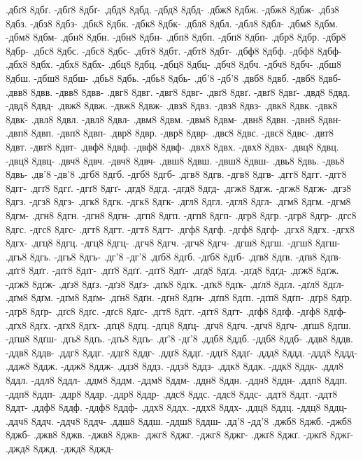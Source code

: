 {.дбґ8 8дбґ. -дбґ8 8дбґ-
.дбд8 8дбд. -дбд8 8дбд-
.дбж8 8дбж. -дбж8 8дбж-
.дбз8 8дбз. -дбз8 8дбз-
.дбк8 8дбк. -дбк8 8дбк-
.дбл8 8дбл. -дбл8 8дбл-
.дбм8 8дбм. -дбм8 8дбм-
.дбн8 8дбн. -дбн8 8дбн-
.дбп8 8дбп. -дбп8 8дбп-
.дбр8 8дбр. -дбр8 8дбр-
.дбс8 8дбс. -дбс8 8дбс-
.дбт8 8дбт. -дбт8 8дбт-
.дбф8 8дбф. -дбф8 8дбф-
.дбх8 8дбх. -дбх8 8дбх-
.дбц8 8дбц. -дбц8 8дбц-
.дбч8 8дбч. -дбч8 8дбч-
.дбш8 8дбш. -дбш8 8дбш-
.дбь8 8дбь. -дбь8 8дбь-
.дб'8 -дб'8
.двб8 8двб. -двб8 8двб-
.двв8 8двв. -двв8 8двв-
.двг8 8двг. -двг8 8двг-
.двґ8 8двґ. -двґ8 8двґ-
.двд8 8двд. -двд8 8двд-
.двж8 8двж. -двж8 8двж-
.двз8 8двз. -двз8 8двз-
.двк8 8двк. -двк8 8двк-
.двл8 8двл. -двл8 8двл-
.двм8 8двм. -двм8 8двм-
.двн8 8двн. -двн8 8двн-
.двп8 8двп. -двп8 8двп-
.двр8 8двр. -двр8 8двр-
.двс8 8двс. -двс8 8двс-
.двт8 8двт. -двт8 8двт-
.двф8 8двф. -двф8 8двф-
.двх8 8двх. -двх8 8двх-
.двц8 8двц. -двц8 8двц-
.двч8 8двч. -двч8 8двч-
.двш8 8двш. -двш8 8двш-
.двь8 8двь. -двь8 8двь-
.дв'8 -дв'8
.дгб8 8дгб. -дгб8 8дгб-
.дгв8 8дгв. -дгв8 8дгв-
.дгг8 8дгг. -дгг8 8дгг-
.дгґ8 8дгґ. -дгґ8 8дгґ-
.дгд8 8дгд. -дгд8 8дгд-
.дгж8 8дгж. -дгж8 8дгж-
.дгз8 8дгз. -дгз8 8дгз-
.дгк8 8дгк. -дгк8 8дгк-
.дгл8 8дгл. -дгл8 8дгл-
.дгм8 8дгм. -дгм8 8дгм-
.дгн8 8дгн. -дгн8 8дгн-
.дгп8 8дгп. -дгп8 8дгп-
.дгр8 8дгр. -дгр8 8дгр-
.дгс8 8дгс. -дгс8 8дгс-
.дгт8 8дгт. -дгт8 8дгт-
.дгф8 8дгф. -дгф8 8дгф-
.дгх8 8дгх. -дгх8 8дгх-
.дгц8 8дгц. -дгц8 8дгц-
.дгч8 8дгч. -дгч8 8дгч-
.дгш8 8дгш. -дгш8 8дгш-
.дгь8 8дгь. -дгь8 8дгь-
.дг'8 -дг'8
.дґб8 8дґб. -дґб8 8дґб-
.дґв8 8дґв. -дґв8 8дґв-
.дґг8 8дґг. -дґг8 8дґг-
.дґґ8 8дґґ. -дґґ8 8дґґ-
.дґд8 8дґд. -дґд8 8дґд-
.дґж8 8дґж. -дґж8 8дґж-
.дґз8 8дґз. -дґз8 8дґз-
.дґк8 8дґк. -дґк8 8дґк-
.дґл8 8дґл. -дґл8 8дґл-
.дґм8 8дґм. -дґм8 8дґм-
.дґн8 8дґн. -дґн8 8дґн-
.дґп8 8дґп. -дґп8 8дґп-
.дґр8 8дґр. -дґр8 8дґр-
.дґс8 8дґс. -дґс8 8дґс-
.дґт8 8дґт. -дґт8 8дґт-
.дґф8 8дґф. -дґф8 8дґф-
.дґх8 8дґх. -дґх8 8дґх-
.дґц8 8дґц. -дґц8 8дґц-
.дґч8 8дґч. -дґч8 8дґч-
.дґш8 8дґш. -дґш8 8дґш-
.дґь8 8дґь. -дґь8 8дґь-
.дґ'8 -дґ'8
.ддб8 8ддб. -ддб8 8ддб-
.ддв8 8ддв. -ддв8 8ддв-
.ддг8 8ддг. -ддг8 8ддг-
.ддґ8 8ддґ. -ддґ8 8ддґ-
.ддд8 8ддд. -ддд8 8ддд-
.ддж8 8ддж. -ддж8 8ддж-
.ддз8 8ддз. -ддз8 8ддз-
.ддк8 8ддк. -ддк8 8ддк-
.ддл8 8ддл. -ддл8 8ддл-
.ддм8 8ддм. -ддм8 8ддм-
.ддн8 8ддн. -ддн8 8ддн-
.ддп8 8ддп. -ддп8 8ддп-
.ддр8 8ддр. -ддр8 8ддр-
.ддс8 8ддс. -ддс8 8ддс-
.ддт8 8ддт. -ддт8 8ддт-
.ддф8 8ддф. -ддф8 8ддф-
.ддх8 8ддх. -ддх8 8ддх-
.ддц8 8ддц. -ддц8 8ддц-
.ддч8 8ддч. -ддч8 8ддч-
.ддш8 8ддш. -ддш8 8ддш-
.дд'8 -дд'8
.джб8 8джб. -джб8 8джб-
.джв8 8джв. -джв8 8джв-
.джг8 8джг. -джг8 8джг-
.джґ8 8джґ. -джґ8 8джґ-
.джд8 8джд. -джд8 8джд-
}
